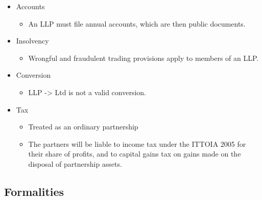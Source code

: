 \documentclass[
]{article}
\providecommand{\tightlist}{%
  \setlength{\itemsep}{0pt}\setlength{\parskip}{0pt}}
\begin{document}
\begin{itemize}
\tightlist
\item
  Accounts

  \begin{itemize}
  \tightlist
  \item
    An LLP must file annual accounts, which are then public documents.
  \end{itemize}
\item
  Insolvency

  \begin{itemize}
  \tightlist
  \item
    Wrongful and fraudulent trading provisions apply to members of an
    LLP.
  \end{itemize}
\item
  Conversion

  \begin{itemize}
  \tightlist
  \item
    LLP -\textgreater{} Ltd is not a valid conversion.
  \end{itemize}
\item
  Tax

  \begin{itemize}
  \tightlist
  \item
    Treated as an ordinary partnership
  \item
    The partners will be liable to income tax under the ITTOIA 2005 for
    their share of profits, and to capital gains tax on gains made on
    the disposal of partnership assets.
  \end{itemize}
\end{itemize}

\hypertarget{formalities-1}{%
\subsection{Formalities}\label{formalities-1}}
\end{document}
